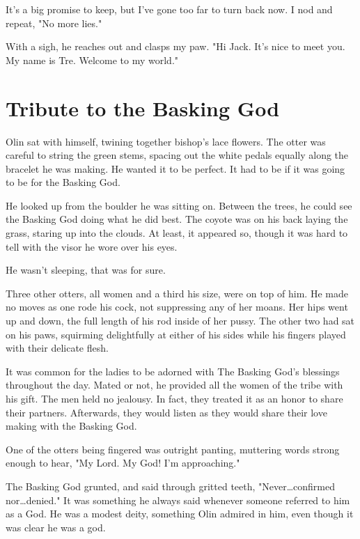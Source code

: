 It's a big promise to keep, but I've gone too far to turn back now. I nod and repeat, "No more lies."

With a sigh, he reaches out and clasps my paw. "Hi Jack. It's nice to meet you. My name is Tre. Welcome to my world."

\cleartoverso


\chapter*{Tribute to the Basking God}


Olin sat with himself, twining together bishop's lace flowers. The otter was careful to string the green stems, spacing out the white pedals equally along the bracelet he was making. He wanted it to be perfect. It had to be if it was going to be for the Basking God.

He looked up from the boulder he was sitting on. Between the trees, he could see the Basking God doing what he did best. The coyote was on his back laying the grass, staring up into the clouds. At least, it appeared so, though it was hard to tell with the visor he wore over his eyes.

He wasn't sleeping, that was for sure.

Three other otters, all women and a third his size, were on top of him. He made no moves as one rode his cock, not suppressing any of her moans. Her hips went up and down, the full length of his rod inside of her pussy. The other two had sat on his paws, squirming delightfully at either of his sides while his fingers played with their delicate flesh.

It was common for the ladies to be adorned with The Basking God's blessings throughout the day. Mated or not, he provided all the women of the tribe with his gift. The men held no jealousy. In fact, they treated it as an honor to share their partners. Afterwards, they would listen as they would share their love making with the Basking God.

One of the otters being fingered was outright panting, muttering words strong enough to hear, "My Lord. My God! I'm approaching."

The Basking God grunted, and said through gritted teeth, "Never\ldots confirmed nor\ldots denied." It was something he always said whenever someone referred to him as a God. He was a modest deity, something Olin admired in him, even though it was clear he was a god.

